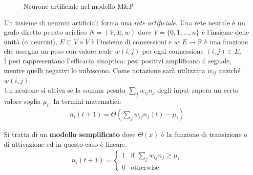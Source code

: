 \begin{figure}[h!]
    \centering
    \caption{Neurone artificiale nel modello M\&P}
\end{figure}

Un insieme di neuroni artificiali forma una \emph{rete artificiale}. Una rete neurale è un grafo diretto pesato aciclico $N=(V,E,w)$ dove $V=\{ 0,1,\dots, n\}$ è l'insieme delle unità (o neuroni), $E \subseteq V \times V$ è l'insieme di connessioni e $w:E \rightarrow \mathbb{R}$ è una funzione che assegna un peso con valore reale $w(i,j)$ per ogni connessione $(i,j)\in E$.\\

I pesi rappresentano l'efficacia sinaptica: pesi positivi amplificano il segnale, mentre quelli negativi lo inibiscono. Come notazione sarà utilizzata $w_{ij}$ anziché $w(i,j)$.\\

Un neurone si attiva se la somma pesata $\sum_j w_{ij} n_j$ degli input supera un certo valore soglia $\mu_i$. In termini matematici:
\begin{align}
    n_i(t + 1) = \Theta\left(\sum_j w_{ij} n_j(t) - \mu_i \right)
\end{align}

\newpage

Si tratta di un \textbf{modello semplificato} dove $\Theta(x)$ è la funzione di transizione o di attivazione ed in questo caso è lineare.
\begin{align}
    n_i(t + 1) =
    \begin{cases}
        1 & \mbox{if } \displaystyle\sum_j w_{ij} n_j \geq \mu_i \\
        0 & \mbox{otherwise} 
    \end{cases}
\end{align}

